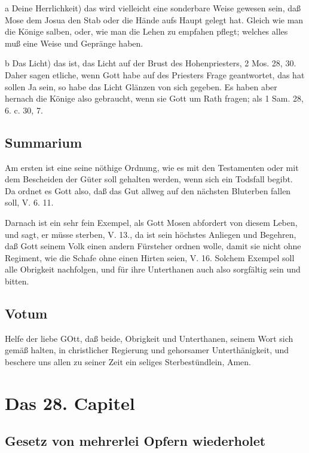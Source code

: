 a Deine Herrlichkeit) das wird vielleicht eine sonderbare Weise gewesen sein, daß Mose dem Josua den Stab oder die Hände aufs Haupt gelegt hat. Gleich wie man die Könige salben, oder, wie man die Lehen zu empfahen pflegt; welches alles muß eine Weise und Gepränge haben.

b Das Licht) das ist, das Licht auf der Brust des Hohenpriesters, 2 Mos. 28, 30. Daher sagen etliche, wenn Gott habe auf des Priesters Frage geantwortet, das hat sollen Ja sein, so habe das Licht Glänzen von sich gegeben. Es haben aber hernach die Könige also gebraucht, wenn sie Gott um Rath fragen; als 1 Sam. 28, 6. c. 30, 7.

\section{Summarium}

Am ersten ist eine seine nöthige Ordnung, wie es mit den Testamenten oder mit dem Bescheiden der Güter soll gehalten werden, wenn sich ein Todsfall begibt. Da ordnet es Gott also, daß das Gut allweg auf den nächsten Bluterben fallen soll, V. 6. 11.

Darnach ist ein sehr fein Exempel, als Gott Mosen abfordert von diesem Leben, und sagt, er müsse sterben, V. 13., da ist sein höchstes Anliegen und Begehren, daß Gott seinem Volk einen andern Fürsteher ordnen wolle, damit sie nicht ohne Regiment, wie die Schafe ohne einen Hirten seien, V. 16. Solchem Exempel soll alle Obrigkeit nachfolgen, und für ihre Unterthanen auch also sorgfältig sein und bitten.

\section{Votum}

Helfe der liebe GOtt, daß beide, Obrigkeit und Unterthanen, seinem Wort sich gemäß halten, in christlicher Regierung und gehorsamer Unterthänigkeit, und beschere uns allen zu seiner Zeit ein seliges Sterbestündlein, Amen.

\chapter{Das 28. Capitel}

\section{Gesetz von mehrerlei Opfern wiederholet}

